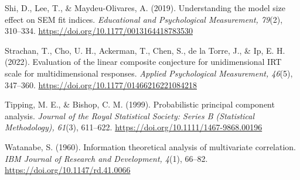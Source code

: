 Shi, D., Lee, T., \& Maydeu-Olivares, A. (2019). Understanding the model size effect on SEM fit indices. \textit{Educational and Psychological Measurement, 79}(2), 310--334. \url{https://doi.org/10.1177/0013164418783530}

Strachan, T., Cho, U. H., Ackerman, T., Chen, S., de la Torre, J., \& Ip, E. H. (2022). Evaluation of the linear composite conjecture for unidimensional IRT scale for multidimensional responses. \textit{Applied Psychological Measurement, 46}(5), 347--360. \url{https://doi.org/10.1177/01466216221084218}

Tipping, M. E., \& Bishop, C. M. (1999). Probabilistic principal component analysis. \textit{Journal of the Royal Statistical Society: Series B (Statistical Methodology), 61}(3), 611--622. \url{https://doi.org/10.1111/1467-9868.00196}

Watanabe, S. (1960). Information theoretical analysis of multivariate correlation. \textit{IBM Journal of Research and Development, 4}(1), 66--82. \url{https://doi.org/10.1147/rd.41.0066}

\endgroup
